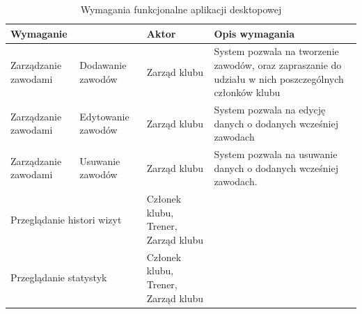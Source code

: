 \documentclass[12pt,twoside]{report}
\begin{document}
\begin{table}[h!]
	\centering
	\begin{tabular}{|p{3cm}|p{3cm}|p{4cm}|p{6cm}|}			
		\hline
		\multicolumn{2}{|l|}{Wymaganie} & Aktor & Opis wymagania\\
		\hline
		Zarządzanie zawodami & Dodawanie zawodów & Zarząd klubu& System pozwala na tworzenie zawodów, oraz zapraszanie do udziału w nich poszczególnych członków klubu\\	
		\hline	
		Zarządzanie zawodami & Edytowanie zawodów & Zarząd klubu& System pozwala na edycję danych o dodanych wcześniej zawodach\\
		\hline
		Zarządzanie zawodami & Usuwanie zawodów & Zarząd klubu& System pozwala na usuwanie danych o dodanych wcześniej zawodach.\\
		\hline
		\multicolumn{2}{|l|}{Przeglądanie histori wizyt}& Członek klubu, Trener, Zarząd klubu&\\
		\hline
		\multicolumn{2}{|l|}{Przeglądanie statystyk}&Członek klubu, Trener, Zarząd klubu&\\
		\hline
	\end{tabular}
	\caption{Wymagania funkcjonalne aplikacji desktopowej}
	\label{funkcjonalneDesktop2}
\end{table}
\newpage
$\ $
\newpage
\end{document}
